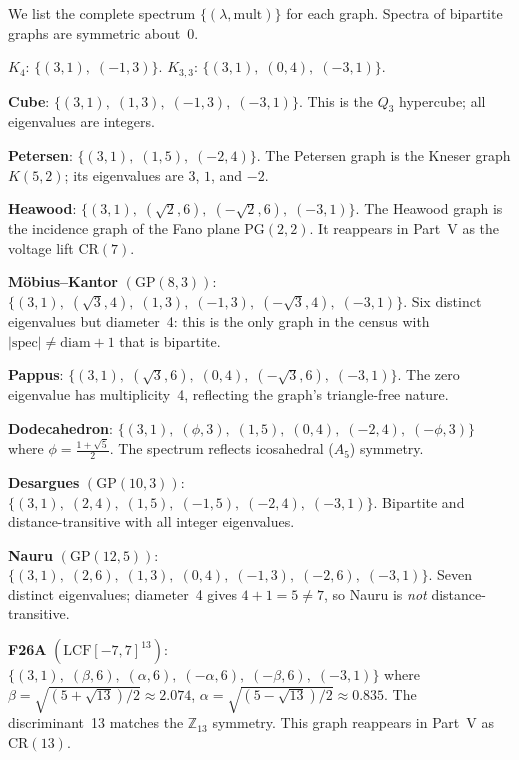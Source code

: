 \documentclass[11pt,a4paper]{article}
\theoremstyle{plain}
\theoremstyle{definition}
\theoremstyle{remark}
\newcommand{\Z}{\mathbb{Z}}
\newcommand{\CR}{\mathrm{CR}}
\newcommand{\GP}{\mathrm{GP}}
\begin{document}
We list the complete spectrum $\{(\lambda, \text{mult})\}$ for each graph.
Spectra of bipartite graphs are symmetric about~0.

\medskip
\noindent
$K_4$: $\{(3, 1),\; (-1, 3)\}$. \quad
$K_{3,3}$: $\{(3, 1),\; (0, 4),\; (-3, 1)\}$.

\medskip
\noindent
\textbf{Cube}: $\{(3,1),\; (1,3),\; (-1,3),\; (-3,1)\}$. This is the $Q_3$ hypercube; all eigenvalues are integers.

\medskip
\noindent
\textbf{Petersen}: $\{(3,1),\; (1,5),\; (-2,4)\}$. The Petersen graph is the Kneser graph $K(5,2)$; its eigenvalues are $3$, $1$, and $-2$.

\medskip
\noindent
\textbf{Heawood}: $\{(3,1),\; (\sqrt{2},6),\; (-\sqrt{2},6),\; (-3,1)\}$. The Heawood graph is the incidence graph of the Fano plane $\mathrm{PG}(2,2)$. It reappears in Part~V as the voltage lift $\CR(7)$.

\medskip
\noindent
\textbf{M\"{o}bius--Kantor} $(\GP(8,3))$: $\{(3,1),\; (\sqrt{3},4),\; (1,3),\; (-1,3),\; (-\sqrt{3},4),\; (-3,1)\}$. Six distinct eigenvalues but diameter~4: this is the only graph in the census with $|\mathrm{spec}| \neq \mathrm{diam}+1$ that is bipartite.

\medskip
\noindent
\textbf{Pappus}: $\{(3,1),\; (\sqrt{3},6),\; (0,4),\; (-\sqrt{3},6),\; (-3,1)\}$. The zero eigenvalue has multiplicity~4, reflecting the graph's triangle-free nature.

\medskip
\noindent
\textbf{Dodecahedron}: $\{(3,1),\; (\phi,3),\; (1,5),\; (0,4),\; (-2,4),\; (-\phi,3)\}$ where $\phi = \tfrac{1+\sqrt{5}}{2}$. The spectrum reflects icosahedral ($A_5$) symmetry.

\medskip
\noindent
\textbf{Desargues} $(\GP(10,3))$: $\{(3,1),\; (2,4),\; (1,5),\; (-1,5),\; (-2,4),\; (-3,1)\}$. Bipartite and distance-transitive with all integer eigenvalues.

\medskip
\noindent
\textbf{Nauru} $(\GP(12,5))$: $\{(3,1),\; (2,6),\; (1,3),\; (0,4),\; (-1,3),\; (-2,6),\; (-3,1)\}$. Seven distinct eigenvalues; diameter~4 gives $4+1=5 \neq 7$, so Nauru is \emph{not} distance-transitive.

\medskip
\noindent
\textbf{F26A} $(\mathrm{LCF}[-7,7]^{13})$: $\{(3,1),\; (\beta,6),\; (\alpha,6),\; (-\alpha,6),\; (-\beta,6),\; (-3,1)\}$
where $\beta = \sqrt{(5+\sqrt{13})/2} \approx 2.074$, $\alpha = \sqrt{(5-\sqrt{13})/2} \approx 0.835$.
The discriminant~13 matches the $\Z_{13}$ symmetry. This graph reappears in Part~V as $\CR(13)$.
\end{document}
